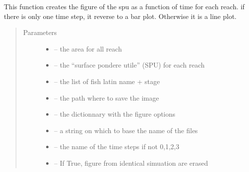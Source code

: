 \documentclass[letterpaper,10pt,english]{sphinxmanual}
\begin{document}
\begin{fulllineitems}
\label{\detokenize{index:src.calcul_hab.save_hab_fig_spu}}
This function creates the figure of the spu as a function of time for each reach. if there is only one
time step, it reverse to a bar plot. Otherwise it is a line plot.
\begin{quote}\begin{description}
\item[{Parameters}] \leavevmode\begin{itemize}
\item {} 
 -- the area for all reach

\item {} 
 -- the ``surface pondere utile'' (SPU) for each reach

\item {} 
 -- the list of fish latin name + stage

\item {} 
 -- the path where to save the image

\item {} 
 -- the dictionnary with the figure options

\item {} 
 -- a string on which to base the name of the files

\item {} 
 -- the name of the time steps if not 0,1,2,3

\item {} 
 -- If True, figure from identical simuation are erased

\end{itemize}

\end{description}\end{quote}

\end{fulllineitems}

\end{document}
